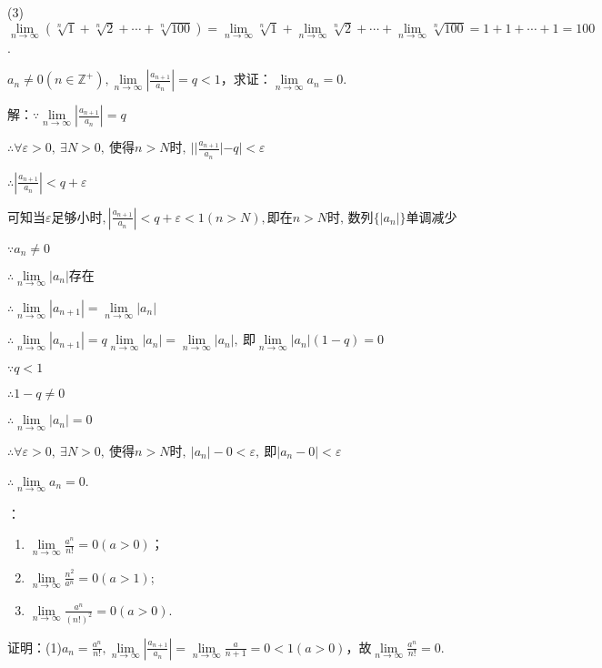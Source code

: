\documentclass[12pt,UTF8]{ctexart}
\begin{document}
\begin{enumerate}
(3)$\lim\limits_{n\rightarrow\infty}(\sqrt[n]1+\sqrt[n]2+\cdots+\sqrt[n]{100})=\lim\limits_{n\rightarrow\infty}\sqrt[n]1+\lim\limits_{n\rightarrow\infty}\sqrt[n]2+\cdots+\lim\limits_{n\rightarrow\infty}\sqrt[n]{100}=1+1+\cdots+1=100$.

$a_n\neq0(n\in\mathbb Z^+),\lim\limits_{n\rightarrow\infty}|\frac{a_{n+1}}{a_n}|=q<1$，求证：$\lim\limits_{n\rightarrow\infty}{a_n}=0$.

解：$\because \lim\limits_{n\rightarrow\infty}|\frac{a_{n+1}}{a_n}|=q$

$\therefore \forall \varepsilon>0,\ \exists N>0,\ \text{使得}n>N\text{时},\ ||\frac{a_{n+1}}{a_n}|-q|<\varepsilon$

$\therefore  |\frac{a_{n+1}}{a_n}|<q+\varepsilon$

$\text{可知当}\varepsilon\text{足够小时}, |\frac{a_{n+1}}{a_n}|<q+\varepsilon<1(n>N), \text{即在}n>N\text{时, 数列}\{|a_n|\}\text{单调减少}$

$\because a_n\neq0$

$\therefore \lim\limits_{n\rightarrow\infty}|a_n|\text{存在}$

$\therefore\lim\limits_{n\rightarrow\infty}|a_{n+1}|=\lim\limits_{n\rightarrow\infty}|a_{n}|$

$\therefore \lim\limits_{n\rightarrow\infty}|a_{n+1}|=q\lim\limits_{n\rightarrow\infty}|a_{n}|=\lim\limits_{n\rightarrow\infty}|a_n|,\ \text{即}\lim\limits_{n\rightarrow\infty}|a_n|(1-q)=0$

$\because q<1$

$\therefore 1-q\neq0$

$\therefore\lim\limits_{n\rightarrow\infty}|a_n|=0$

$\therefore \forall \varepsilon>0,\ \exists N>0,\ \text{使得}n>N\text{时},\ |a_n|-0<\varepsilon,\ \text{即}|a_n-0|<\varepsilon$

$ \therefore\lim\limits_{n\rightarrow\infty}a_n=0$.

：
\begin{enumerate}[(1)]
	\item$\lim\limits_{n\rightarrow\infty}\frac{a^n}{n!}=0(a>0)$；
	\item$\lim\limits_{n\rightarrow\infty}\frac{n^2}{a^n}=0(a>1)$;
	\item$\lim\limits_{n\rightarrow\infty}\frac{a^n}{(n!)^2}=0(a>0)$.
\end{enumerate}
证明：(1)$a_n=\frac{a^n}{n!},\lim\limits_{n\rightarrow\infty}|\frac{a_{n+1}}{a_n}|=\lim\limits_{n\rightarrow\infty}\frac a{n+1}=0<1(a>0)$，故$\lim\limits_{n\rightarrow\infty}\frac{a^n}{n!}=0$.


\end{enumerate}
\end{document}
